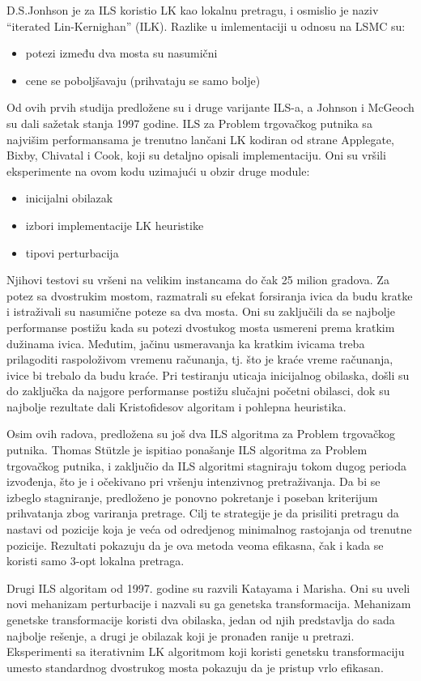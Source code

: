 \documentclass[a4paper]{article}
\newcommand{\q}[1]{``#1''}  %
\begin{document}
D.S.Jonhson je za ILS koristio LK kao lokalnu pretragu, i osmislio je naziv \q{iterated Lin-Kernighan} (ILK). Razlike u imlementaciji u odnosu na LSMC su:
\begin{itemize}
  \item potezi između dva mosta su nasumični
  \item cene se poboljšavaju (prihvataju se samo bolje)
\end{itemize}
Od ovih prvih studija predložene su i druge varijante ILS-a, a Johnson i McGeoch su dali sažetak stanja 1997 godine. 
ILS za Problem trgovačkog putnika sa najvišim performansama je trenutno lančani LK kodiran od strane Applegate, Bixby, Chivatal i Cook, koji su detaljno opisali implementaciju. Oni su vršili eksperimente na ovom kodu uzimajući u obzir druge module:
\begin{itemize}
  \item inicijalni obilazak
  \item izbori implementacije LK heuristike
  \item tipovi perturbacija
\end{itemize}
Njihovi testovi su vršeni na velikim instancama do čak 25 milion gradova. Za potez sa dvostrukim mostom, razmatrali su efekat forsiranja ivica da budu kratke i istraživali su nasumične poteze sa dva mosta. Oni su zaključili da se najbolje performanse postižu kada su potezi dvostukog mosta usmereni prema kratkim dužinama ivica. Međutim, jačinu usmeravanja ka kratkim ivicama treba prilagoditi raspoloživom vremenu računanja, tj. što je kraće vreme računanja, ivice bi trebalo da budu kraće. Pri testiranju uticaja inicijalnog obilaska, došli su do zaključka da najgore performanse postižu slučajni početni obilasci, dok su najbolje rezultate dali Kristofidesov algoritam i pohlepna heuristika. 

Osim ovih radova, predložena su još dva ILS algoritma za Problem trgovačkog putnika. Thomas Stützle je ispitiao ponašanje ILS algoritma za Problem trgovačkog putnika, i zaključio da ILS algoritmi stagniraju tokom dugog perioda izvođenja, što je i očekivano pri vršenju intenzivnog pretraživanja. Da bi se izbeglo stagniranje, predloženo je ponovno pokretanje i poseban kriterijum prihvatanja zbog variranja pretrage. Cilj te strategije je da prisiliti pretragu da nastavi od pozicije koja je veća od odredjenog minimalnog rastojanja od trenutne pozicije. Rezultati pokazuju da je ova metoda veoma efikasna, čak i kada se koristi samo 3-opt lokalna pretraga. 


Drugi ILS algoritam od 1997. godine su razvili Katayama i Marisha. Oni su uveli novi mehanizam perturbacije i nazvali su ga genetska transformacija. Mehanizam genetske transformacije koristi dva obilaska, jedan od njih predstavlja do sada najbolje rešenje, a drugi je obilazak koji je pronađen ranije u pretrazi. Eksperimenti sa iterativnim LK algoritmom koji koristi genetsku transformaciju umesto standardnog dvostrukog mosta pokazuju da je pristup vrlo efikasan.
\end{document}
